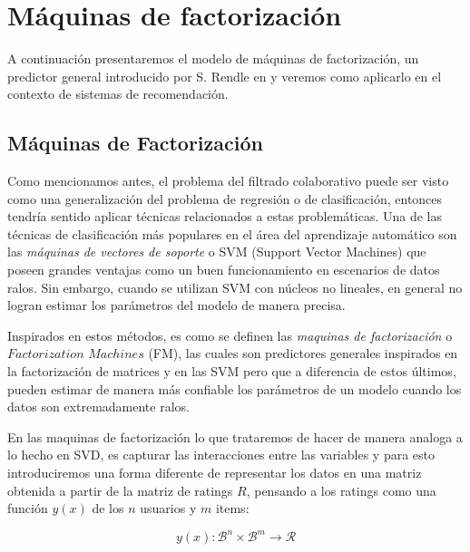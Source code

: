 \documentclass[hidelinks,12pt,a4paper]{book}
\theoremstyle{plain}
\theoremstyle{definition}
\begin{document}

\chapter{Máquinas de factorización}

A continuación presentaremos el modelo de máquinas de factorización, un predictor general introducido por S. Rendle en \cite{rendle2010factorization} y veremos como aplicarlo en el contexto de sistemas de recomendación.

\section{Máquinas de Factorización}

Como mencionamos antes, el problema del filtrado colaborativo puede ser visto como una generalización del problema de regresión o de clasificación, entonces tendría sentido aplicar técnicas relacionados a estas problemáticas. Una de las técnicas de clasificación más populares en el área del aprendizaje automático son las \textit{máquinas de vectores de soporte} o SVM (Support Vector Machines) que poseen grandes ventajas como un buen funcionamiento en escenarios de datos ralos. Sin embargo, cuando se utilizan SVM con núcleos no lineales, en general no logran estimar los parámetros del modelo de manera precisa.

Inspirados en estos métodos, es como se definen  las \textit{maquinas de factorización} o $Factorization$ $Machines$ (FM), las cuales son predictores generales inspirados en la factorización de matrices y en las SVM pero que a diferencia de estos últimos, pueden estimar de manera más confiable los parámetros de un modelo cuando los datos son extremadamente ralos\cite{rendle2010factorization}.

En las maquinas de factorización lo que trataremos de hacer de manera analoga a lo hecho en SVD, es capturar las interacciones entre las variables y para esto introduciremos una forma diferente de representar los datos en una matriz obtenida a partir de la matriz de ratings $R$, pensando a los ratings como una función $y(x)$ de los $n$ usuarios y $m$ items:

\begin{equation*}
y(x):\mathcal{B}^n \times \mathcal{B}^m \longrightarrow \mathcal{R}
\end{equation*}
\end{document}
